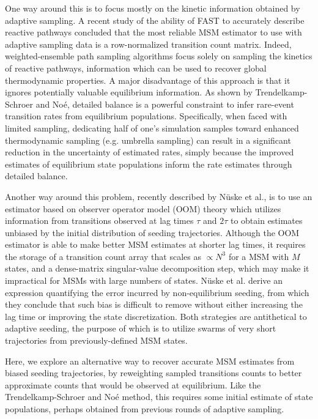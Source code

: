 \documentclass[%
 aip,
rsi,%
 amsmath,amssymb,
 reprint,%
]{revtex4-1}
\begin{document}
One way around this is to focus mostly on the kinetic information obtained by adaptive sampling.  A recent study of the ability of FAST to accurately describe reactive pathways concluded that the most reliable MSM estimator to use with adaptive sampling data is a row-normalized transition count matrix.\cite{Zimmerman:2018jn} Indeed, weighted-ensemble path sampling algorithms focus solely on sampling the kinetics of reactive pathways, information which can be used to recover global thermodynamic properties.\cite{BinWZhang:2010kf,Zwier:2015fn, Dickson:2016it, Lotz:2018hx, Dixon:2018fs} A major disadvantage of this approach is that it ignores potentially valuable equilibrium information.  As shown by Trendelkamp-Schroer and No{\'e},\cite{trendelkamp2016efficient} detailed balance is a powerful constraint to infer rare-event transition rates from equilibrium populations.  Specifically, when faced with limited sampling, dedicating half of one's simulation samples toward enhanced thermodynamic sampling (e.g. umbrella sampling) can result in a significant reduction in the uncertainty of estimated rates, simply because the improved estimates of equilibrium state populations inform the rate estimates through detailed balance.

Another way around this problem, recently described by N{\"u}ske et al., is to use an estimator based on observer operator model (OOM) theory which utilizes information from transitions observed at lag times $\tau$ and $2\tau$ to obtain estimates unbiased by the initial distribution of seeding trajectories.\cite{Nuske:2017ex}  Although the OOM estimator is able to make better MSM estimates at shorter lag times, it requires the storage of a transition count array that scales as $\propto N^3$ for a MSM with $M$ states, and a dense-matrix singular-value decomposition step, which may make it impractical for MSMs with large numbers of states.  N{\"u}ske et al. derive an expression quantifying the error incurred by non-equilibrium seeding, from which they conclude that such bias is difficult to remove without either increasing the lag time or improving the state discretization.  Both strategies are antithetical to adaptive seeding, the purpose of which is to utilize swarms of very short trajectories from previously-defined MSM states. 

Here, we explore an alternative way to recover accurate MSM estimates from biased seeding trajectories, by reweighting sampled transitions counts to better approximate counts that would be observed at equilibrium.  Like the Trendelkamp-Schroer and No{\'e} method, this requires some initial estimate of state populations, perhaps obtained from previous rounds of adaptive sampling.
\end{document}
